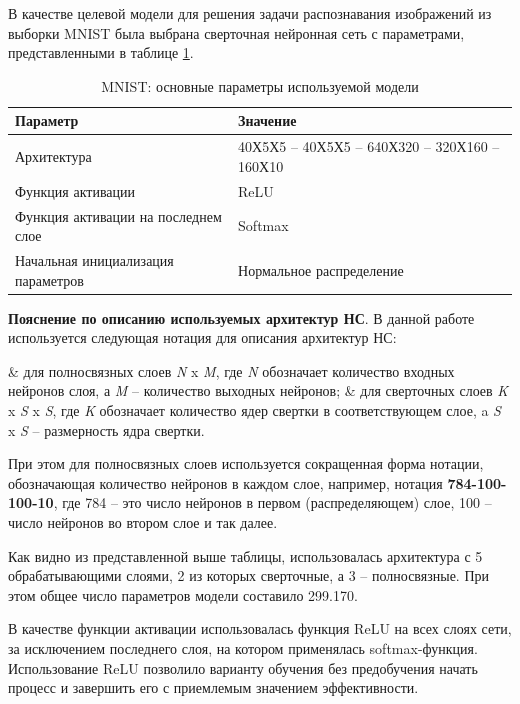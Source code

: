 В качестве целевой модели для решения задачи распознавания изображений из выборки MNIST была выбрана сверточная нейронная сеть с параметрами, представленными в таблице \ref{table:mnist_conv_model}.

\begin{table} [!h]
  \caption{MNIST: основные параметры используемой модели}\label{table:mnist_conv_model}
\centering
\begin{tabular}{| p{7cm} | p{8cm} |}
  \hline
    \textbf{Параметр} & \textbf{Значение}\\
    \hline
    Архитектура & 40Х5Х5 -- 40Х5Х5 -- 640Х320 -- 320Х160 -- 160Х10\\
    \hline
    Функция активации & ReLU \\
    \hline
    Функция активации на последнем слое & Softmax \\
    Начальная инициализация параметров & Нормальное распределение \\
    \hline
\end{tabular}
\end{table}

\textbf{Пояснение по описанию используемых архитектур НС}. В данной работе используется следующая нотация для описания архитектур НС: 
\begin{easylist}
  & для полносвязных слоев \textit{N} x \textit{M}, где \textit{N} обозначает количество входных нейронов слоя, а \textit{M} -- количество выходных нейронов;  
  & для сверточных слоев \textit{K} x \textit{S} x \textit{S}, где \textit{K} обозначает количество ядер свертки в соответствующем слое, a \textit{S} x \textit{S} -- размерность ядра свертки.
\end{easylist}
При этом для полносвязных слоев используется сокращенная форма нотации, обозначающая количество нейронов в каждом слое, например, нотация \textbf{784-100-100-10}, где 784 -- это число нейронов в первом (распределяющем) слое, 100 -- число нейронов во втором слое и так далее. 

Как видно из представленной выше таблицы, использовалась архитектура с 5 обрабатывающими слоями, 2 из которых сверточные, а 3 -- полносвязные. При этом общее число параметров модели составило 299.170.

В качестве функции активации использовалась функция ReLU на всех слоях сети, за исключением последнего слоя, на котором применялась softmax-функция. Использование ReLU позволило варианту обучения без предобучения начать процесс и завершить его с приемлемым значением эффективности.

